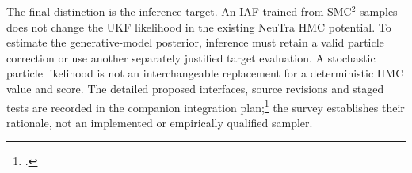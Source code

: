 The final distinction is the inference target. An IAF trained from SMC$^2$
samples does not change the UKF likelihood in the existing NeuTra HMC
potential. To estimate the generative-model posterior, inference must
retain a valid particle correction or use another separately justified
target evaluation. A stochastic particle likelihood is not an interchangeable
replacement for a deterministic HMC value and score. The detailed proposed
interfaces, source revisions and staged tests are recorded in the companion
integration plan;\footnote{\raggedright
\def\UrlBreaks{\do\/\do\-}
.\par}
the survey establishes their rationale, not an implemented
or empirically qualified sampler.
